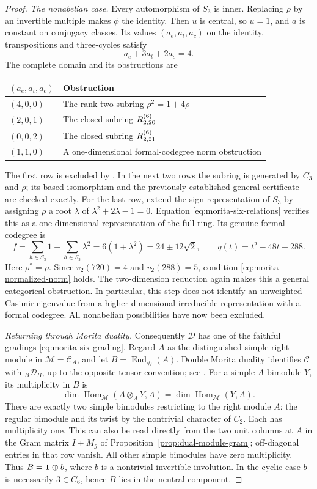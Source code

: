 \begin{proof}
\smallskip\noindent
\emph{The nonabelian case.}
Every automorphism of $S_3$ is inner. Replacing $\rho$ by an invertible
multiple makes $\phi$ the identity. Then $u$ is central, so $u=1$,
and $a$ is constant on conjugacy classes. Its values
$(a_e,a_t,a_c)$ on the identity, transpositions and three-cycles satisfy
\[
 a_e+3a_t+2a_c=4.
\]
The complete domain and its obstructions are
\begin{center}
\begin{tabular}{@{}ll@{}}
\toprule
$(a_e,a_t,a_c)$ & Obstruction \\
\midrule
$(4,0,0)$ & The rank-two subring $\rho^2=1+4\rho$ \\
$(2,0,1)$ & The closed subring $R^{(6)}_{2,20}$ \\
$(0,0,2)$ & The closed subring $R^{(6)}_{2,21}$ \\
$(1,1,0)$ & A one-dimensional formal-codegree norm obstruction \\
\bottomrule
\end{tabular}
\end{center}
The first row is excluded by \cite{Ostrik2}. In the next two rows the
subring is generated by $C_3$ and $\rho$; its based isomorphism and the
previously established general certificate are checked exactly.
For the last row, extend the sign representation of $S_3$ by assigning
$\rho$ a root $\lambda$ of $\lambda^2+2\lambda-1=0$. Equation
\eqref{eq:morita-six-relations} verifies this as a one-dimensional
representation of the full ring. Its genuine formal codegree is
\[
 f=\sum_{h\in S_3}1+\sum_{h\in S_3}\lambda^2
   =6(1+\lambda^2)=24\pm12\sqrt2,
 \qquad q(t)=t^2-48t+288.
\]
Here $\rho^*=\rho$. Since $v_2(720)=4$ and $v_2(288)=5$, condition
\eqref{eq:morita-normalized-norm} holds. The two-dimension reduction
again makes this a general categorical obstruction. In particular, this
step does not identify an unweighted Casimir eigenvalue from a
higher-dimensional irreducible representation with a formal codegree.
All nonabelian possibilities have now been excluded.

\smallskip\noindent
\emph{Returning through Morita duality.}
Consequently $\mathcal D$ has one of the faithful gradings
\eqref{eq:morita-six-grading}. Regard $A$ as the distinguished simple
right module in $\mathcal M=\mathcal C_A$, and let
$B=\underline{\operatorname{End}}_{\mathcal D}(A)$. Double Morita
duality identifies $\mathcal C$ with ${}_B\mathcal D_B$, up to the
opposite tensor convention; see \cite[Chapter~7]{EGNO}.
For a simple $A$-bimodule $Y$, its multiplicity in $B$ is
\[
 \dim\operatorname{Hom}_{\mathcal M}(A\otimes_A Y,A)
 =\dim\operatorname{Hom}_{\mathcal M}(Y,A).
\]
There are exactly two simple bimodules restricting to the right module
$A$: the regular bimodule and its twist by the nontrivial character of
$C_2$. Each has multiplicity one. This can also be read directly from
the two unit columns at $A$ in the Gram matrix $I+M_g$ of
Proposition~\ref{prop:dual-module-gram}; off-diagonal entries in that
row vanish. All other simple bimodules have zero multiplicity. Thus
$B=\mathbf1\oplus b$, where $b$ is a nontrivial invertible involution.
In the cyclic case $b$ is necessarily $3\in C_6$, hence $B$ lies in
the neutral component.


\end{proof}
